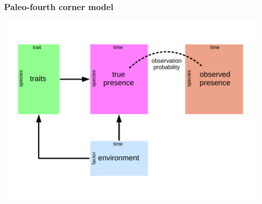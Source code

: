 \documentclass{beamer}
\begin{document}
\begin{frame}
  \frametitle{Paleo-fourth corner model}

  \begin{center}
    \includegraphics[height=0.8\textheight,width=\textwidth,keepaspectratio=true]{figure/paleo_fourth_corner}
  \end{center}
\end{frame}
\end{document}
